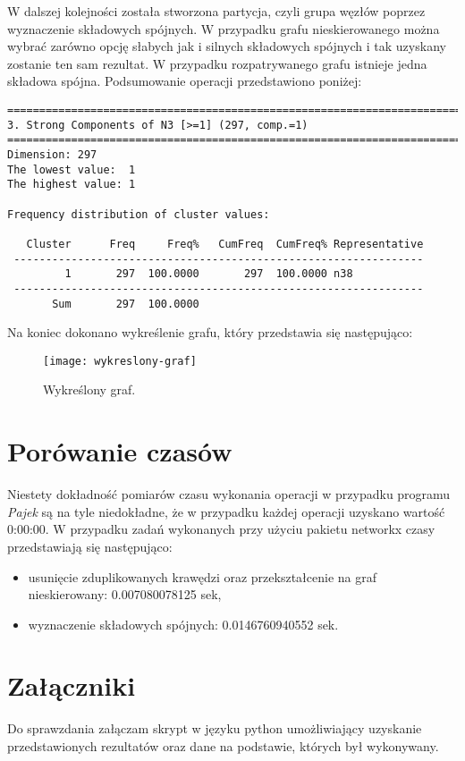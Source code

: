 \documentclass[10pt,a4paper]{article}
\begin{document}
W dalszej kolejności została stworzona partycja, czyli grupa węzłów poprzez wyznaczenie składowych spójnych. W przypadku grafu nieskierowanego można wybrać zarówno opcję słabych jak i silnych składowych spójnych i tak uzyskany zostanie ten sam rezultat. W przypadku rozpatrywanego grafu istnieje jedna składowa spójna. Podsumowanie operacji przedstawiono poniżej:
\begin{verbatim}
==============================================================================
3. Strong Components of N3 [>=1] (297, comp.=1)
==============================================================================
Dimension: 297
The lowest value:  1
The highest value: 1

Frequency distribution of cluster values:

   Cluster      Freq     Freq%   CumFreq  CumFreq% Representative
 ----------------------------------------------------------------
         1       297  100.0000       297  100.0000 n38
 ----------------------------------------------------------------
       Sum       297  100.0000
\end{verbatim}

Na koniec dokonano wykreślenie grafu, który przedstawia się następująco:
\begin{figure}[H]
	\centering
	\texttt{[image: wykreslony-graf]}
	\caption{Wykreślony graf.
	\label{fig:graf}}
\end{figure}

\section{Porówanie czasów}
Niestety dokładność pomiarów czasu wykonania operacji w przypadku programu \textit{Pajek} są na tyle niedokładne, że w przypadku każdej operacji uzyskano wartość 0:00:00. W przypadku zadań wykonanych przy użyciu pakietu networkx czasy przedstawiają się następująco:
\begin{itemize}
\item usunięcie zduplikowanych krawędzi oraz przekształcenie na graf nieskierowany: 0.007080078125
sek,
\item wyznaczenie składowych spójnych: 0.0146760940552 sek.
\end{itemize}

\section{Załączniki}
Do sprawzdania załączam skrypt w języku python umożliwiający uzyskanie przedstawionych rezultatów oraz dane na podstawie, których był wykonywany.
\end{document}
